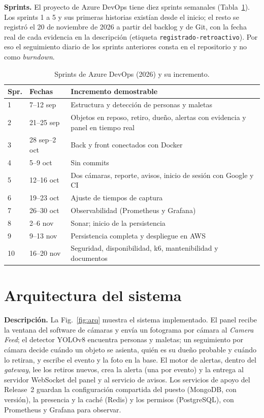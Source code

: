 \documentclass[conference]{IEEEtran}
\begin{document}
\textbf{Sprints.} El proyecto de Azure DevOps tiene diez sprints semanales (Tabla~\ref{tab:sprints}). Los sprints 1 a 5 y sus primeras historias existían desde el inicio;
el resto se registró el 20 de noviembre de 2026 a partir del backlog y de Git, con la fecha real de cada evidencia en la descripción (etiqueta
\texttt{registrado-retroactivo}). Por eso el seguimiento diario de los sprints anteriores consta en el repositorio y no como \emph{burndown}.

\begin{table}[t]
\centering\caption{Sprints de Azure DevOps (2026) y su incremento.}\label{tab:sprints}
\footnotesize
\begin{tabular}{@{}p{0.5cm}p{1.6cm}p{5.1cm}@{}}
\toprule
\textbf{Spr.} & \textbf{Fechas} & \textbf{Incremento demostrable} \\
\midrule
1 & 7--12 sep & Estructura y detección de personas y maletas \\
2 & 21--25 sep & Objetos en reposo, retiro, dueño, alertas con evidencia y panel en tiempo real \\
3 & 28 sep--2 oct & Back y front conectados con Docker \\
4 & 5--9 oct & Sin commits \\
5 & 12--16 oct & Dos cámaras, reporte, avisos, inicio de sesión con Google y CI \\
6 & 19--23 oct & Ajuste de tiempos de captura \\
7 & 26--30 oct & Observabilidad (Prometheus y Grafana) \\
8 & 2--6 nov & Sonar; inicio de la persistencia \\
9 & 9--13 nov & Persistencia completa y despliegue en AWS \\
10 & 16--20 nov & Seguridad, disponibilidad, k6, mantenibilidad y documentos \\
\bottomrule
\end{tabular}
\end{table}

\section{Arquitectura del sistema}
\textbf{Descripción.} La Fig.~\ref{fig:arq} muestra el sistema implementado. El panel recibe la ventana del software de cámaras y envía un fotograma por cámara
al \emph{Camera Feed}; el detector YOLOv8 \cite{yolo} encuentra personas y maletas; un seguimiento por cámara decide cuándo un objeto se asienta, quién
es su dueño probable y cuándo lo retiran, y escribe el evento y la foto en la base. El motor de alertas, dentro del \emph{gateway}, lee los retiros nuevos, crea la
alerta (una por evento) y la entrega al servidor WebSocket del panel y al servicio de avisos. Los servicios de apoyo del Release~2 guardan la configuración
compartida del puesto (MongoDB, con versión), la presencia y la caché (Redis) y los permisos (PostgreSQL), con Prometheus y Grafana para observar.
\end{document}
